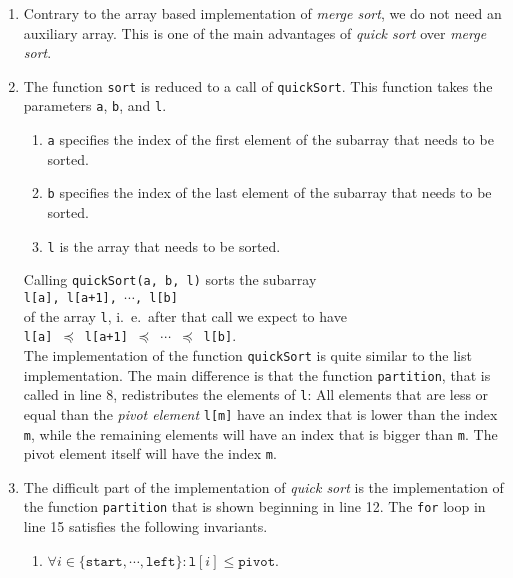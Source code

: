 \begin{enumerate}
\item Contrary to the array based implementation of \emph{merge sort}, we do not need an auxiliary
      array.  This is one of the main advantages of \emph{quick sort} over \emph{merge sort}.
\item The function \texttt{sort} is reduced to a call of \texttt{quickSort}.  This function
      takes the parameters \texttt{a}, \texttt{b}, and \texttt{l}.  
      \begin{enumerate}
      \item \texttt{a} specifies the index of the first element of the subarray that needs to be
            sorted.
      \item \texttt{b} specifies the index of the last element of the subarray that needs to be
            sorted. 
      \item \texttt{l} is the array that needs to be sorted.
      \end{enumerate}
      Calling \texttt{quickSort(a, b, l)} sorts the subarray \\[0.2cm]
      \hspace*{1.3cm} 
      \texttt{l[a], l[a+1], $\cdots$, l[b]}
      \\[0.2cm]
      of the array \texttt{l}, i.~e.~after that call we expect to have\\[0.2cm]
      \hspace*{1.3cm}
      \texttt{l[a] $\preceq$ l[a+1] $\preceq$ $\cdots$ $\preceq$ l[b]}.
      \\[0.2cm]
      The implementation of the function \texttt{quickSort}
      is quite similar to the list implementation.  The main difference is that the function
      \texttt{partition}, that is called in line 8, redistributes the elements of \texttt{l}:
      All elements that are less or equal than the \emph{pivot element} \texttt{l[m]}
      have an index that is lower than the index \texttt{m}, while the remaining elements will have
      an index that is bigger than \texttt{m}.  The pivot element itself will have the index \texttt{m}.
\item The difficult part of the implementation of \emph{quick sort} is the implementation of the
      function \texttt{partition} that is shown beginning in line 12.
      The \texttt{for} loop in line 15 satisfies the following invariants.
      \begin{enumerate}
      \item $\forall i \in \{ \mathtt{start}, \cdots, \mathtt{left} \} : \mathtt{l}[i] \leq \mathtt{pivot}$.


\end{enumerate}
\end{enumerate}
